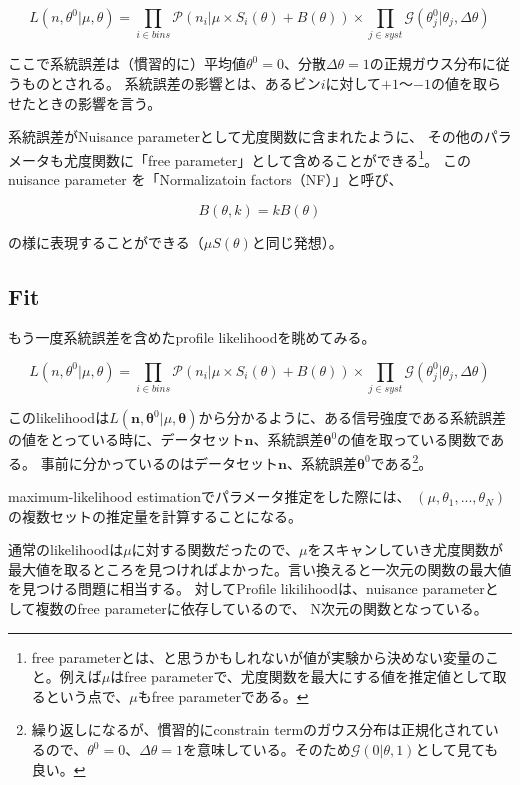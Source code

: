 \begin{equation}
L(n,\theta^0|\mu,\theta) = \prod_{i\in bins} \mathcal{P}(n_i|\mu \times S_i(\theta)+B(\theta)) \times \prod_{j\in syst} \mathcal{G}(\theta_j^0|\theta_j,\Delta \theta)
\end{equation}

ここで系統誤差は（慣習的に）平均値$\theta^0=0$、分散$\Delta \theta=1$の正規ガウス分布に従うものとされる。
系統誤差の影響とは、あるビン$i$に対して$+1$〜$-1$の値を取らせたときの影響を言う。

系統誤差がNuisance parameterとして尤度関数に含まれたように、
その他のパラメータも尤度関数に「free parameter」として含めることができる\footnote{free parameterとは、と思うかもしれないが値が実験から決めない変量のこと。例えば$\mu$はfree parameterで、尤度関数を最大にする値を推定値として取るという点で、$\mu$もfree parameterである。}。
この nuisance parameter を「Normalizatoin factors（NF）」と呼び、

\begin{equation}
B(\theta,k)=kB(\theta)
\end{equation}

の様に表現することができる（$\mu S(\theta)$と同じ発想）。

\subsection{Fit}

もう一度系統誤差を含めたprofile likelihoodを眺めてみる。

\begin{equation}
L(n,\theta^0|\mu,\theta) = \prod_{i\in bins} \mathcal{P}(n_i|\mu \times S_i(\theta)+B(\theta)) \times \prod_{j\in syst} \mathcal{G}(\theta_j^0|\theta_j,\Delta \theta)
\end{equation}

このlikelihoodは$L(\bm{n},\bm{\theta}^0|\mu,\bm{\theta})$から分かるように、ある信号強度である系統誤差の値をとっている時に、データセット$\bm{n}$、系統誤差$\bm{\theta}^0$の値を取っている関数である。
事前に分かっているのはデータセット$\bm{n}$、系統誤差$\bm{\theta}^0$である\footnote{繰り返しになるが、慣習的にconstrain termのガウス分布は正規化されているので、$\theta^0=0$、$\Delta \theta=1$を意味している。そのため$\mathcal{G}(0|\theta,1)$として見ても良い。}。

maximum-likelihood estimationでパラメータ推定をした際には、
$(\mu,\theta_1,...,\theta_N )$の複数セットの推定量を計算することになる。

通常のlikelihoodは$\mu$に対する関数だったので、$\mu$をスキャンしていき尤度関数が最大値を取るところを見つければよかった。言い換えると一次元の関数の最大値を見つける問題に相当する。
対してProfile likilihoodは、nuisance parameterとして複数のfree parameterに依存しているので、
N次元の関数となっている。


